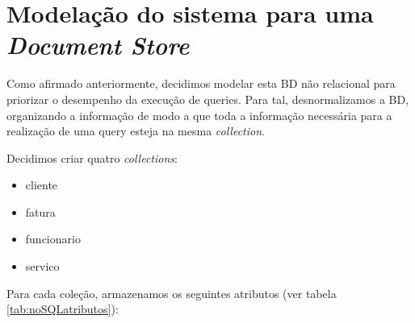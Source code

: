 \chapter{Modelação do sistema para uma \emph{Document Store}}

Como afirmado anteriormente, decidimos modelar esta BD não relacional para priorizar o desempenho da execução de queries. Para tal, desnormalizamos a BD, organizando a informação de modo a que toda a informação necessária para a realização de uma query esteja na mesma \emph{collection}.

Decidimos criar quatro \emph{collections}:
\begin{itemize}
    \item cliente
    \item fatura
    \item funcionario
    \item servico
\end{itemize}

Para cada coleção, armazenamos os seguintes atributos (ver tabela \ref{tab:noSQLatributos}):

